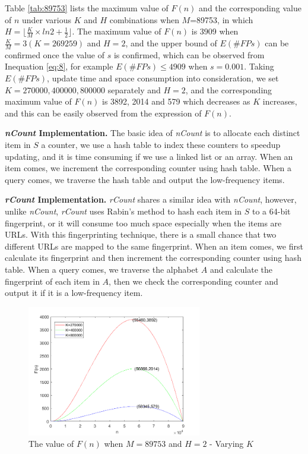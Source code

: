 \documentclass[conference]{IEEEtran}
\begin{document}
Table \ref{tab:89753} lists the maximum value of $F(n)$ and the corresponding value of $n$ under various $K$ and $H$ combinations when $M$=89753, in which $H=\lfloor\frac{K}{M}\times ln2+\frac{1}{2}\rfloor$. The maximum value of $F(n)$ is 3909 when $\frac{K}{M}=3(K=269259)$ and $H=2$, and the upper bound of $E(\#FPs)$ can be confirmed once the value of $s$ is confirmed, which can be observed from Inequation \ref{eq:8}, for example $E(\#FPs)\leq 4909$ when $s=0.001$. Taking $E(\#FPs)$, update time and space consumption into consideration, we set $K=270000,400000,800000$ separately and $H=2$, and the corresponding maximum value of $F(n)$ is 3892, 2014 and 579 which decreases as $K$ increases, and this can be easily observed from the expression of $F(n)$.\par

\textbf{\emph{nCount} Implementation.} The basic idea of \emph{nCount} is to allocate each distinct item in $S$ a counter, we use a hash table to index these counters to speedup updating, and it is time consuming if we use a linked list or an array. When an item comes, we increment the corresponding counter using hash table. When a query comes, we traverse the hash table and output the low-frequency items. \par

\textbf{\emph{rCount} Implementation.} \emph{rCount} shares a similar idea with \emph{nCount}, however, unlike \emph{nCount}, \emph{rCount} uses Rabin's method \cite{rabin1981fingerprinting} to hash each item in $S$ to a 64-bit fingerprint, or it will consume too much space especially when the items are URLs. With this fingerprinting technique, there is a small chance that two diﬀerent URLs are mapped to the same fingerprint. When an item comes, we first calculate its fingerprint and then increment the corresponding counter using hash table. When a query comes, we traverse the alphabet $A$ and calculate the fingerprint of each item in $A$, then we check the corresponding counter and output it if it is a low-frequency item.\par

\begin{figure}
	\centering
	\includegraphics[width=3in]{png/F(n)-combine.png}
	\caption{The value of $F(n)$ when $M=89753$ and $H=2$ - Varying $K$}
	\label{fig:F(n)}
\end{figure}
\end{document}
